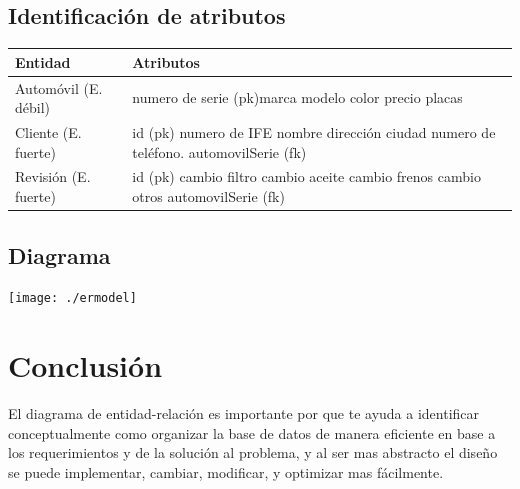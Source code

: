 \documentclass[spanish,12pt,letterpapper]{article}
\begin{document}
	\subsection{Identificación de atributos}
	\begin{center}
	\begin{tabular}{| p{4cm} | p{4cm} |}
	\hline
	
	\textbf{Entidad} & \textbf{Atributos}\\
	\hline
	Automóvil (E. débil) & numero de serie (pk)\linebreak marca \linebreak modelo \linebreak color \linebreak precio \linebreak placas\\
	\hline
	Cliente (E. fuerte) & id (pk) \linebreak numero de IFE \linebreak nombre \linebreak dirección \linebreak ciudad \linebreak numero de teléfono. \linebreak automovilSerie (fk) \\
	\hline
	Revisión (E. fuerte) & id (pk) \linebreak cambio filtro \linebreak cambio aceite \linebreak cambio frenos \linebreak cambio otros \linebreak automovilSerie (fk) \\
	
	\hline	
	\end{tabular}
	\end{center}
	
	\subsection{Diagrama}
		
	\begin{center}
	\texttt{[image: ./ermodel]}~\\[1cm] 
	\end{center}
	
	\section{Conclusión}
	El diagrama de entidad-relación es importante por que te ayuda a identificar conceptualmente como organizar la base de datos de manera eficiente en base a los requerimientos y de la solución al problema, y al ser mas abstracto el diseño se puede implementar, cambiar, modificar, y optimizar mas fácilmente.\\
	
\end{document}
